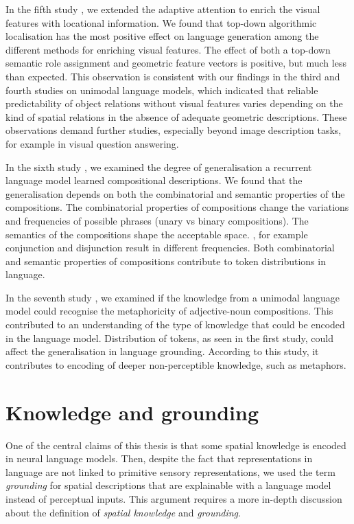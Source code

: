 In the fifth study \citep{ghanimifard-dobnik-2019-what}, we extended the adaptive attention to 
enrich
the visual features with locational information. We found that top-down algorithmic localisation has the most positive effect on language generation among the different methods for enriching visual features. 
The effect of both a top-down semantic role assignment and geometric feature vectors is positive, but 
much less than expected.
This observation is consistent with our findings in the third and fourth studies on unimodal language models, which indicated that reliable predictability of object relations without visual features varies depending on the kind of spatial relations in the absence of adequate geometric descriptions. 
These observations demand 
further 
studies, especially beyond image description tasks, for example in visual question answering.

In the sixth study \citep{ghanimifard-dobnik-2017-learning}, we%
examined
the degree of generalisation%
a recurrent language model learned compositional descriptions. 
We found that the generalisation depends on both the combinatorial and semantic properties of the compositions. 
The combinatorial properties of compositions change the variations and frequencies of possible phrases (unary vs binary compositions). 
The semantics of the compositions shape the acceptable space. 
, for example conjunction and disjunction result in different frequencies.
Both combinatorial and semantic properties of compositions contribute to token distributions in language.

In the seventh study \citep{bizzoni-etal-2017-deep}, we examined if the knowledge from a unimodal language model could recognise the metaphoricity of adjective-noun compositions.
This contributed to an understanding of the type of knowledge that could be encoded in the language model. 
Distribution of tokens, as seen in the first study, could affect the generalisation in language grounding. According to this study, it 
contributes to encoding of deeper
non-perceptible knowledge, such as metaphors.


\section{Knowledge and grounding}
One of the central claims of this thesis is that some spatial knowledge is encoded in neural language models. Then, despite the fact that representations in language are not linked to primitive sensory representations, we used the term \emph{grounding} for spatial descriptions that are explainable with a language model instead of perceptual inputs.
This argument requires a more in-depth discussion about the definition of \emph{spatial knowledge} and \emph{grounding}.

